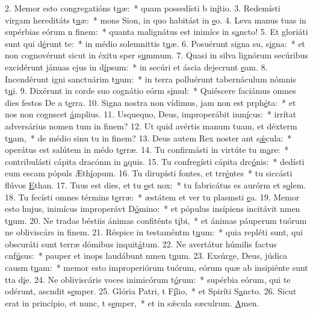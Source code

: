 2. Memor esto congregatións t\uline{u}æ:~* quam possedísti b in\uline{í}tio.
3. Redemísti virgam hereditáts t\uline{u}æ:~* mons Sion, in quo habitást in \uline{e}o.
4. Leva manus tuas in supérbias eórum n f\uline{i}nem:~* quanta malignátus est inimícs in s\uline{a}ncto!
5. Et gloriáti sunt qui d\uline{é}runt te:~* in médio solemnittis t\uline{u}æ.
6. Posuérunt signa su, s\uline{i}gna:~* et non cognovérunt sicut in éxitu sper s\uline{u}mmum.
7. Quasi in silva lignórum secúribus excidérunt jánuas ejus in d\uline{í}psum:~* in secúri et áscia dejecrunt \uline{e}am.
8. Incendérunt igni sanctuárim t\uline{u}um:~* in terra polluérunt tabernáculum nómnis t\uline{u}i.
9. Dixérunt in corde suo cognátio eórm s\uline{i}mul:~* Quiéscere faciámus omnes dies festos De a t\uline{e}rra.
10. Signa nostra non vídimus, jam non est prph\uline{é}ta:~* et nos non cognscet \uline{á}mplius.
11. Usquequo, Deus, improperábit inm\uline{í}cus:~* irrítat adversárius nomen tum in f\uline{i}nem?
12. Ut quid avértis manum tuam, et déxterm t\uline{u}am,~* de médio sinu tu in f\uline{i}nem?
13. Deus autem Rex noster ant s\uline{ǽ}cula:~* operátus est salútem in médo t\uline{e}rræ.
14. Tu confirmásti in virtúte tu m\uline{a}re:~* contribulásti cápita dracónm in \uline{a}quis.
15. Tu confregísti cápita drc\uline{ó}nis:~* dedísti eum escam pópuls Æth\uline{í}opum.
16. Tu dirupísti fontes, et trr\uline{é}ntes~* tu siccásti flúvos \uline{E}than.
17. Tuus est dies, et tu \uline{e}st nox:~* tu fabricátus es aurórm et s\uline{o}lem.
18. Tu fecísti omnes términs t\uline{e}rræ:~* æstátem et ver tu plasmsti \uline{e}a.
19. Memor esto hujus, inimícus improperávt D\uline{ó}mino:~* et pópulus insípiens incitávit nmen t\uline{u}um.
20. Ne tradas béstiis ánimas confiténts t\uline{i}bi,~* et ánimas páuperum tuórum ne obliviscárs in f\uline{i}nem.
21. Réspice in testaméntm t\uline{u}um:~* quia repléti sunt, qui obscuráti sunt terræ dómibus inquit\uline{á}tum.
22. Ne avertátur húmilis factus cnf\uline{ú}sus:~* pauper et inops laudábunt nmen t\uline{u}um.
23. Exsúrge, Deus, júdica causm t\uline{u}am:~* memor esto improperiórum tuórum, eórum quæ ab insipiénte sunt tta d\uline{i}e.
24. Ne obliviscáris voces inimicórum t\uline{ó}rum:~* supérbia eórum, qui te odérunt, ascndit s\uline{e}mper.
25. Glória Patri, t F\uline{í}lio,~* et Spiríti S\uline{a}ncto.
26. Sicut erat in princípio, et nunc, t s\uline{e}mper,~* et in sǽcula sæculrum. \uline{A}men.
